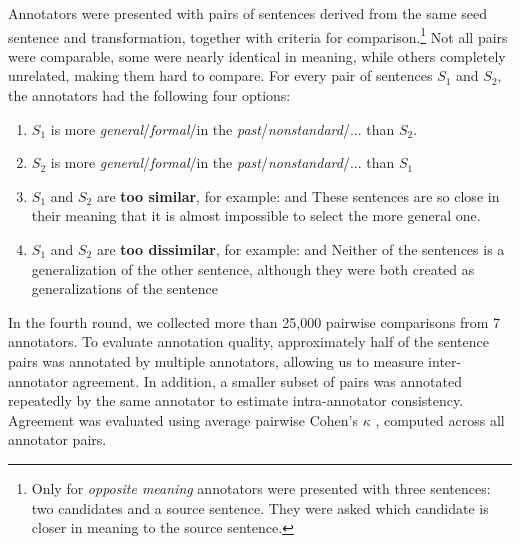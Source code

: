 Annotators were presented with pairs of sentences derived from the same seed sentence and transformation, together with criteria for comparison.\footnote{Only for \textit{opposite meaning} annotators were presented with three sentences: two candidates and a source sentence. They were asked which candidate is closer in meaning to the source sentence.} Not all pairs were comparable, some were nearly identical in meaning, while others completely unrelated, making them hard to compare. For every pair of sentences $S_1$ and $S_2$, the annotators had the following four options:

\begin{enumerate}
	\item $S_1$ is more \textit{general}/\textit{formal}/in the \textit{past}/\textit{nonstandard}/... than $S_2$.
	\item $S_2$ is more \textit{general}/\textit{formal}/in the \textit{past}/\textit{nonstandard}/... than $S_1$
	\item $S_1$ and $S_2$ are \textbf{too similar}, for example:  and  These sentences are so close in their meaning that it is almost impossible to select the more general one. 
    \item $S_1$ and $S_2$ are \textbf{too dissimilar}, for example:  and  Neither of the sentences is a generalization of the other sentence, although they were both created as generalizations of the sentence   
\end{enumerate}

In the fourth round, we collected more than 25{,}000 pairwise comparisons from 7 annotators. To evaluate annotation quality, approximately half of the sentence pairs was annotated by multiple annotators, allowing us to measure inter-annotator agreement. In addition, a smaller subset of pairs was annotated repeatedly by the same annotator to estimate intra-annotator consistency. Agreement was evaluated using average pairwise Cohen’s $\kappa$ \citep{carletta-1996-assessing}, computed across all annotator pairs.

